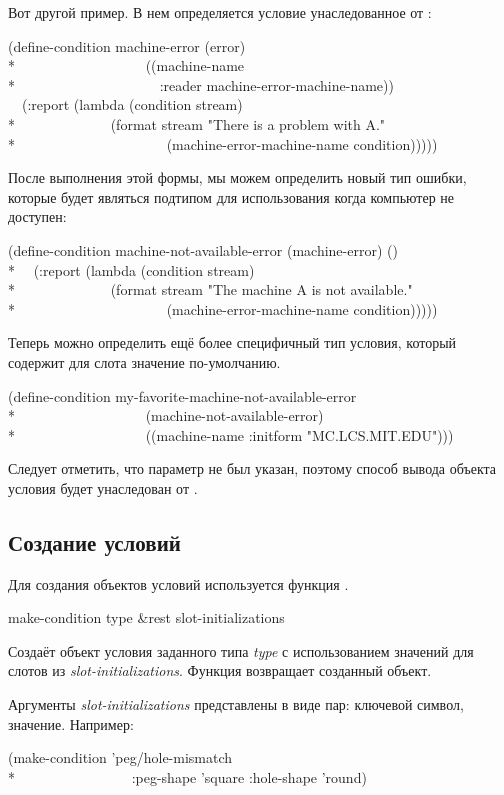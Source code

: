 \begin{defmac}
Вот другой пример. В нем определяется условие  унаследованное
от :
\begin{lisp}
(define-condition machine-error (error) \\*
~~~~~~~~~~~~~~~~~~((machine-name \\*
~~~~~~~~~~~~~~~~~~~~:reader machine-error-machine-name)) \\
~~(:report (lambda (condition stream) \\*
~~~~~~~~~~~~~(format stream "There is a problem with {\Xtilde}A." \\*
~~~~~~~~~~~~~~~~~~~~~(machine-error-machine-name condition)))))
\end{lisp}
После выполнения этой формы, мы можем определить новый тип ошибки, которые будет
являться подтипом  для использования когда компьютер не доступен:
\begin{lisp}
(define-condition machine-not-available-error (machine-error) () \\*
~~(:report (lambda (condition stream) \\*
~~~~~~~~~~~~~(format stream "The machine {\Xtilde}A is not available." \\*
~~~~~~~~~~~~~~~~~~~~~(machine-error-machine-name condition)))))
\end{lisp}
Теперь можно определить ещё более специфичный тип условия, который содержит для
слота  значение по-умолчанию.
\begin{lisp}
(define-condition my-favorite-machine-not-available-error \\*
~~~~~~~~~~~~~~~~~~(machine-not-available-error) \\*
~~~~~~~~~~~~~~~~~~((machine-name :initform "MC.LCS.MIT.EDU")))
\end{lisp}
Следует отметить, что параметр  не был указан, поэтому способ вывода
объекта условия будет унаследован от .
\end{defmac}

\subsection{Создание условий}

Для создания объектов условий используется функция .

\begin{defun}[Функция]
make-condition type &rest slot-initializations

Создаёт объект условия заданного типа \emph{type} с использованием значений для
слотов из \emph{slot-initializations}. Функция возвращает созданный объект.

Аргументы \emph{slot-initializations} представлены в виде пар: ключевой символ,
значение. Например:
\begin{lisp}
(make-condition 'peg/hole-mismatch \\*
~~~~~~~~~~~~~~~~:peg-shape 'square :hole-shape 'round)
\end{lisp}
\end{defun}

